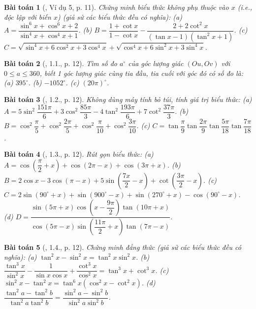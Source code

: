 \documentclass{article}
\newtheorem{baitoan}{Bài toán}
\begin{document}
\begin{baitoan}[\cite{Hung_nang_cao_phat_trien_Toan_11_tap_1}, Ví dụ 5, p. 11]
	Chứng minh biểu thức không phụ thuộc vào $x$ (i.e., độc lập với biến $x$) (giả sử các biểu thức đều có nghĩa): (a) $A = \dfrac{\sin^6x + \cos^6x + 2}{\sin^4x + \cos^4x + 1}$. (b) $B = \dfrac{1 + \cot x}{1 - \cot x} - \dfrac{2 + 2\cot^2x}{(\tan x - 1)(\tan^2x + 1)}$. (c) $C = \sqrt{\sin^4x + 6\cos^2x + 3\cos^4x} + \sqrt{\cos^4x + 6\sin^2x + 3\sin^4x}$.
\end{baitoan}

\begin{baitoan}[\cite{Hung_nang_cao_phat_trien_Toan_11_tap_1}, 1.1., p. 12]
	Tìm số đo $a^\circ$ của góc lượng giác $(Ou,Ov)$ với $0\le a\le360$, biết 1 góc lượng giác cùng tia đầu, tia cuối với góc đó có số đo là: (a) $395^\circ$. (b) $-1052^\circ$. (c) $(20\pi)^\circ$.
\end{baitoan}

\begin{baitoan}[\cite{Hung_nang_cao_phat_trien_Toan_11_tap_1}, 1.2., p. 12]
	Không dùng máy tính bỏ túi, tính giá trị biểu thức: (a) $A = 5\sin^2\dfrac{151\pi}{6} + 3\cos^2\dfrac{85\pi}{3} - 4\tan^2\dfrac{193\pi}{6} + 7\cot^2\dfrac{37\pi}{3}$. (b) $B = \cos^2\dfrac{\pi}{5} + \cos^2\dfrac{2\pi}{5} + \cos^2\dfrac{\pi}{10} + \cos^2\dfrac{3\pi}{10}$. (c) $C = \tan\dfrac{\pi}{9}\tan\dfrac{2\pi}{9}\tan\dfrac{5\pi}{18}\tan\dfrac{7\pi}{18}$.
\end{baitoan}

\begin{baitoan}[\cite{Hung_nang_cao_phat_trien_Toan_11_tap_1}, 1.3., p. 12]
	Rút gọn biểu thức: (a) $A = \cos\left(\dfrac{\pi}{2} + x\right) + \cos(2\pi - x) + \cos(3\pi + x)$. (b) $B = 2\cos x - 3\cos(\pi - x) + 5\sin\left(\dfrac{7x}{2} - x\right) + \cot\left(\dfrac{3\pi}{2} - x\right)$. (c) $C = 2\sin(90^\circ + x) + \sin(900^\circ - x) + \sin(270^\circ + x) - \cos(90^\circ - x)$. (d) $D = \dfrac{\sin(5\pi + x)\cos\left(x - \dfrac{9\pi}{2}\right)\tan(10\pi + x)}{\cos(5\pi - x)\sin\left(\dfrac{11\pi}{2} + x\right)\tan(7\pi - x)}$.
\end{baitoan}

\begin{baitoan}[\cite{Hung_nang_cao_phat_trien_Toan_11_tap_1}, 1.4., p. 12]
	Chứng minh đẳng thức (giả sử các biểu thức đều có nghĩa): (a) $\tan^2x - \sin^2x = \tan^2x\sin^2x$. (b) $\dfrac{\tan^3x}{\sin^2x} - \dfrac{1}{\sin x\cos x} + \dfrac{\cot^3x}{\cos^2x} = \tan^3x + \cot^3x$. (c) $\sin^2x - \tan^2x = \tan^6x(\cos^2x - \cot^2x)$. (d) $\dfrac{\tan^2a - \tan^2b}{\tan^2a\tan^2b} = \dfrac{\sin^2a - \sin^2b}{\sin^2a\sin^2b}$.
\end{baitoan}
\end{document}
